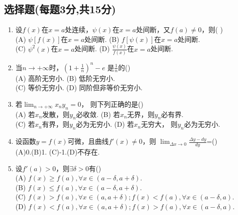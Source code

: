 \documentclass[a4paper,12pt]{article}
\begin{document}
\begin{spacing}{2.0}
    \section{选择题(每题3分,共15分)}
    \begin{enumerate}[(1)]
        \item 设$f(x)$在$x=a$处连续，$\psi(x)$在$x=a$处间断，又$f(a)\neq0$，则( )\\
            (A) $\psi[f(x)]$在$x=a$处间断. \hspace{1cm} (B) $f[\psi(x)]$在$x=a$处间断.\\ 
            (C) $\psi^2(x)$在$x=a$处间断. \hspace{1.5cm} (D) $\displaystyle \frac{\psi(x)}{f(x)}$在$x=a$处间断. 
        \item 当$n\rightarrow +\infty$时，$\displaystyle \left(1+\frac{1}{n}\right)^n-e$
            是$\displaystyle \frac{1}{n}$的(\hspace{0.5cm}) \\
            (A) 高阶无穷小. \hspace{1.5cm} (B) 低阶无穷小. \\
            (C) 等价无穷小. \hspace{1.5cm} (D) 同阶但非等价无穷小.  
        \item 若$\displaystyle \lim_{n\rightarrow +\infty}x_ny_n=0$，
            则下列正确的是(\hspace{0.5cm})\\
            (A) 若$x_n$发散，则$y_n$必收敛. \hspace{1.0cm} (B) 若$x_n$无界，则$y_n$必有界.\\
            (C) 若$x_n$有界，则$y_n$必为无穷小. \hspace{0.2cm} (D) 若$x_n$无穷大，
            则$y_n$必为无穷小.
        \item 设函数$y=f(x)$可微，且曲线$f'(x)\neq0$，则
            $\displaystyle \lim_{\Delta x\rightarrow 0}\frac{\Delta y-dy}{dy}$=(\hspace{0,5cm})\\
            (A)0.\hspace{1.5cm}(B)1. \hspace{1.5cm}(C)-1.\hspace{1.5cm}(D)不存在.   
        \item 设$f'(a)>0$，则$\exists \delta>0$有(\hspace{0.5cm})\\
            (A) $f(x)\geq f(a), \forall x \in (a-\delta, a+\delta).$\\
            (B) $f(x)\leq f(a), \forall x \in (a-\delta, a+\delta).$\\
            (C) $f(x)>f(a),\forall x\in(a, a+\delta);f(x)<f(a),\forall x \in (a-\delta,a).$\\
            (D) $f(x)<f(a),\forall x\in(a, a+\delta);f(x)>f(a),\forall x \in (a-\delta,a).$
    \end{enumerate}


\end{spacing}
\end{document}
